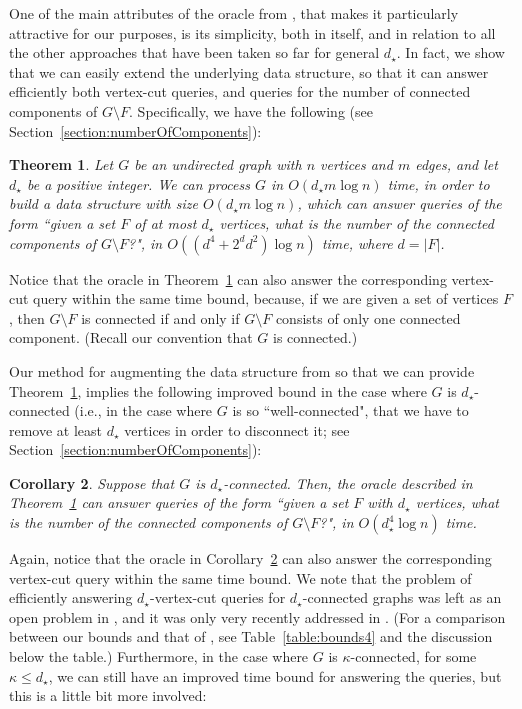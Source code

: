 \documentclass[11pt,a4paper]{article}
\newtheorem{theorem}{Theorem}[section]
\newtheorem{corollary}[theorem]{Corollary}
\begin{document}
One of the main attributes of the oracle from \cite{DBLP:conf/esa/Kosinas23}, that makes it particularly attractive for our purposes, is its simplicity, both in itself, and in relation to all the other approaches that have been taken so far for general $d_{\star}$. In fact, we show that we can easily extend the underlying data structure, so that it can answer efficiently both vertex-cut queries, and queries for the number of connected components of $G\setminus F$. Specifically, we have the following (see Section~\ref{section:numberOfComponents}):

\begin{theorem}
\label{theorem2}
Let $G$ be an undirected graph with $n$ vertices and $m$ edges, and let $d_{\star}$ be a positive integer. We can process $G$ in $O(d_{\star}m\log{n})$ time, in order to build a data structure with size $O(d_{\star}m\log{n})$, which can answer queries of the form ``given a set $F$ of at most $d_{\star}$ vertices, what is the number of the connected components of $G\setminus F$?", in $O((d^4+ 2^dd^2)\log{n})$ time, where $d=|F|$.
\end{theorem}

Notice that the oracle in Theorem~\ref{theorem2} can also answer the corresponding vertex-cut query within the same time bound, because, if we are given a set of vertices $F$, then $G\setminus F$ is connected if and only if $G\setminus F$ consists of only one connected component. (Recall our convention that $G$ is connected.)  

Our method for augmenting the data structure from \cite{DBLP:conf/esa/Kosinas23} so that we can provide Theorem~\ref{theorem2}, implies the following improved bound in the case where $G$ is $d_{\star}$-connected (i.e., in the case where $G$ is so ``well-connected", that we have to remove at least $d_{\star}$ vertices in order to disconnect it; see Section~\ref{section:numberOfComponents}):

\begin{corollary}
\label{corollary1}
Suppose that $G$ is $d_{\star}$-connected. Then, the oracle described in Theorem~\ref{theorem2} can answer queries of the form ``given a set $F$ with $d_{\star}$ vertices, what is the number of the connected components of $G\setminus F$?", in $O(d_{\star}^4\log{n})$ time.
\end{corollary}

Again, notice that the oracle in Corollary~\ref{corollary1} can also answer the corresponding vertex-cut query within the same time bound. We note that the problem of efficiently answering $d_{\star}$-vertex-cut queries for $d_{\star}$-connected graphs was left as an open problem in \cite{DBLP:conf/icalp/PettieY21}, and it was only very recently addressed in \cite{arxivMerav}. (For a comparison between our bounds and that of \cite{arxivMerav}, see Table~\ref{table:bounds4} and the discussion below the table.) Furthermore, in the case where $G$ is $\kappa$-connected, for some $\kappa\leq d_{\star}$, we can still have an improved time bound for answering the queries, but this is a little bit more involved:
\end{document}

